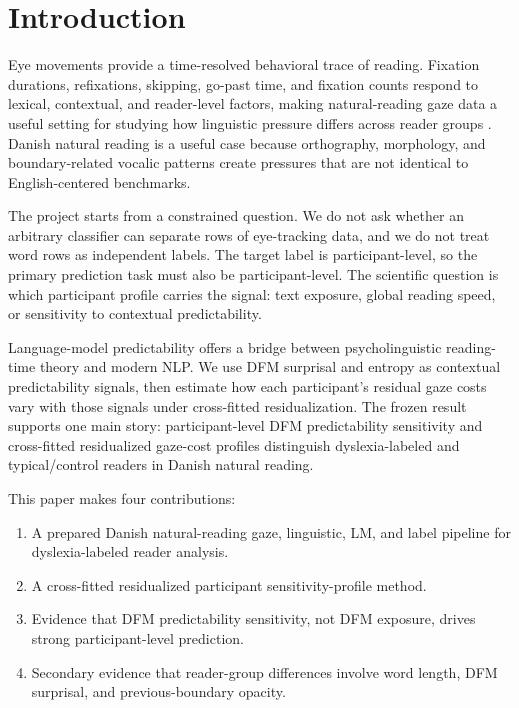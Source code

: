 \section{Introduction}
Eye movements provide a time-resolved behavioral trace of reading. Fixation durations,
refixations, skipping, go-past time, and fixation counts respond to lexical,
contextual, and reader-level factors, making natural-reading gaze data a useful setting
for studying how linguistic pressure differs across reader groups
\cite{rayner1998eye,duchowski2017eye}. Danish natural reading is a useful case because
orthography, morphology, and boundary-related vocalic patterns create pressures that
are not identical to English-centered benchmarks.

The project starts from a constrained question. We do not ask whether an arbitrary
classifier can separate rows of eye-tracking data, and we do not treat word rows as
independent labels. The target label is participant-level, so the primary prediction
task must also be participant-level. The scientific question is which participant
profile carries the signal: text exposure, global reading speed, or sensitivity to
contextual predictability.

Language-model predictability offers a bridge between psycholinguistic reading-time
theory and modern NLP. We use DFM surprisal and entropy as contextual predictability
signals, then estimate how each participant's residual gaze costs vary with those
signals under cross-fitted residualization. The frozen result supports one main story:
participant-level DFM predictability sensitivity and cross-fitted residualized
gaze-cost profiles distinguish dyslexia-labeled and typical/control readers in Danish
natural reading.

This paper makes four contributions:
\begin{enumerate}
\item A prepared Danish natural-reading gaze, linguistic, LM, and label pipeline for dyslexia-labeled reader analysis.
\item A cross-fitted residualized participant sensitivity-profile method.
\item Evidence that DFM predictability sensitivity, not DFM exposure, drives strong participant-level prediction.
\item Secondary evidence that reader-group differences involve word length, DFM surprisal, and previous-boundary opacity.
\end{enumerate}
